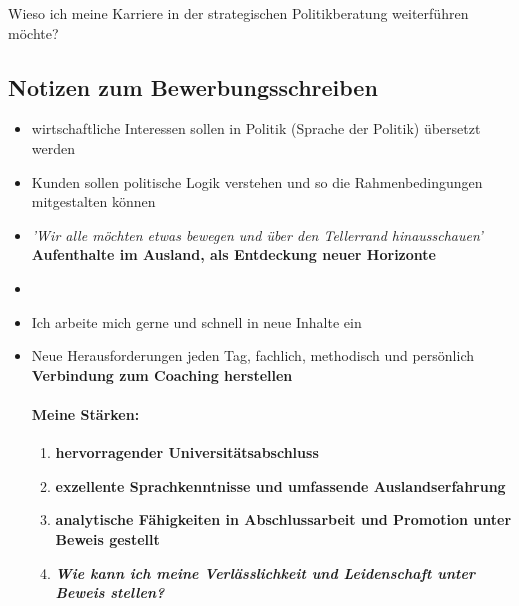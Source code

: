 \documentclass[11pt,a4paper]{article}
\begin{document}
Wieso ich meine Karriere in der strategischen Politikberatung weiterführen möchte? 


\subsection*{\textsf{Notizen zum Bewerbungsschreiben}}

\begin{itemize}

\item wirtschaftliche Interessen sollen in Politik (Sprache der Politik) übersetzt werden

\item Kunden sollen politische Logik verstehen und so die Rahmenbedingungen mitgestalten können

\item \textsl{'Wir alle möchten etwas bewegen und über den Tellerrand hinausschauen'}\\
 \textbf{Aufenthalte im Ausland, als Entdeckung neuer Horizonte}

\item 

\item Ich arbeite mich gerne und schnell in neue Inhalte ein

\item Neue Herausforderungen jeden Tag, fachlich, methodisch und persönlich\\
 \textbf{Verbindung zum Coaching herstellen}

\paragraph*{\textsf{Meine Stärken:}}

\begin{enumerate}

\item \textbf{hervorragender Universitätsabschluss}

\item \textbf{exzellente Sprachkenntnisse und umfassende Auslandserfahrung}

\item \textbf{analytische Fähigkeiten in Abschlussarbeit und Promotion unter Beweis gestellt}

\item \textbf{\textsl{Wie kann ich meine Verlässlichkeit und Leidenschaft unter Beweis stellen?}}

\end{enumerate}



\end{itemize}
\end{document}
